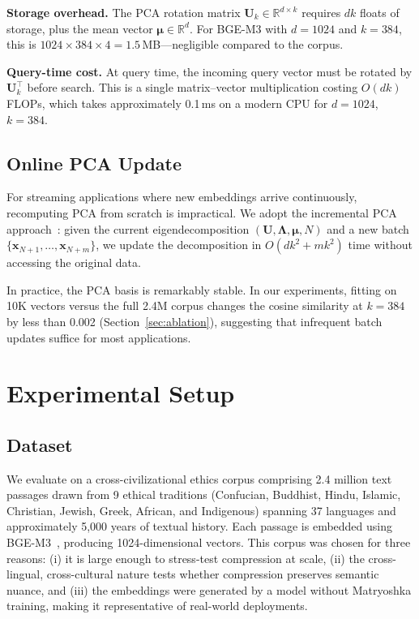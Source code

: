 \documentclass[journal]{IEEEtran}
\newcommand{\R}{\mathbb{R}}
\begin{document}
\textbf{Storage overhead.}
The PCA rotation matrix $\mathbf{U}_k \in \R^{d \times k}$ requires $dk$ floats of storage, plus the mean vector $\boldsymbol{\mu} \in \R^d$.
For BGE-M3 with $d = 1024$ and $k = 384$, this is $1024 \times 384 \times 4 = 1.5$\,MB---negligible compared to the corpus.

\textbf{Query-time cost.}
At query time, the incoming query vector must be rotated by $\mathbf{U}_k^\top$ before search.
This is a single matrix--vector multiplication costing $O(dk)$ FLOPs, which takes approximately 0.1\,ms on a modern CPU for $d = 1024$, $k = 384$.

\subsection{Online PCA Update}
\label{sec:online_pca}

For streaming applications where new embeddings arrive continuously, recomputing PCA from scratch is impractical.
We adopt the incremental PCA approach~\cite{cardoso2015incremental}: given the current eigendecomposition $(\mathbf{U}, \boldsymbol{\Lambda}, \boldsymbol{\mu}, N)$ and a new batch $\{\mathbf{x}_{N+1}, \ldots, \mathbf{x}_{N+m}\}$, we update the decomposition in $O(dk^2 + mk^2)$ time without accessing the original data.

In practice, the PCA basis is remarkably stable.
In our experiments, fitting on 10K vectors versus the full 2.4M corpus changes the cosine similarity at $k = 384$ by less than 0.002 (Section~\ref{sec:ablation}), suggesting that infrequent batch updates suffice for most applications.


\section{Experimental Setup}
\label{sec:setup}

\subsection{Dataset}

We evaluate on a cross-civilizational ethics corpus comprising 2.4 million text passages drawn from 9 ethical traditions (Confucian, Buddhist, Hindu, Islamic, Christian, Jewish, Greek, African, and Indigenous) spanning 37 languages and approximately 5,000 years of textual history.
Each passage is embedded using BGE-M3~\cite{xiao2024bge}, producing 1024-dimensional vectors.
This corpus was chosen for three reasons: (i) it is large enough to stress-test compression at scale, (ii) the cross-lingual, cross-cultural nature tests whether compression preserves semantic nuance, and (iii) the embeddings were generated by a model without Matryoshka training, making it representative of real-world deployments.
\end{document}
